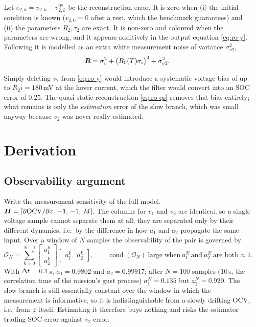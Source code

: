 \begin{assumption}\label{as:ro-cost}
Let $e_{2,k}=v_{2,k}-v^{\mathrm{qs}}_{2,k}$ be the reconstruction error.  It is zero when (i) the
initial condition is known ($v_{2,0}=0$ after a rest, which the benchmark guarantees) and (ii) the
parameters $R_2,\tau_2$ are exact.  It is non-zero and coloured when the parameters are wrong, and
it appears additively in the output equation \eqref{eq:ro-y}.  Following
\cite[Ch.~10]{simon2006} it is modelled as an extra white measurement noise of variance
$\sigma_{v2}^2$,
\begin{equation}
\bm{R} = \sigma_v^2 + \big(R_0(T)\sigma_i\big)^2 + \sigma_{v2}^2 .
\label{eq:ro-R}
\end{equation}
\end{assumption}

\begin{remark}\label{rem:ro-notdrop}
Simply deleting $v_2$ from \eqref{eq:ro-y} would introduce a systematic voltage bias of up to
$R_2 i=180$\,mV at the hover current, which the filter would convert into an SOC error of
$0.25$.  The quasi-static reconstruction \eqref{eq:ro-qs} removes that bias entirely; what remains
is only the \emph{estimation} error of the slow branch, which was small anyway because $v_2$ was
never really estimated.
\end{remark}

\section{Derivation}

\subsection{Observability argument}
Write the measurement sensitivity of the full model,
$\bm{H}=[\partial\mathrm{OCV}/\partial z,\,-1,\,-1,\,M]$.  The columns for $v_1$ and $v_2$ are identical,
so a single voltage sample cannot separate them at all; they are separated only by their different
dynamics, i.e.\ by the difference in how $a_1$ and $a_2$ propagate the same input.  Over a window
of $N$ samples the observability of the pair is governed by
\begin{equation}
\mathcal{O}_N=\sum_{k=0}^{N-1}\begin{bmatrix}a_1^k\\a_2^k\end{bmatrix}
                              \begin{bmatrix}a_1^k&a_2^k\end{bmatrix},
\qquad
\operatorname{cond}(\mathcal{O}_N)\ \text{large when}\ a_1^N\ \text{and}\ a_2^N\ \text{are both}\approx1 .
\label{eq:ro-obs}
\end{equation}
With $\Delta t=0.1$\,s, $a_1=0.9802$ and $a_2=0.99917$: after $N=100$ samples (10\,s, the correlation
time of the mission's gust process) $a_1^N=0.135$ but $a_2^N=0.920$.  The slow branch is still
essentially constant over the window in which the measurement is informative, so it is
indistinguishable from a slowly drifting OCV, i.e.\ from $z$ itself.  Estimating it therefore
buys nothing and risks the estimator trading SOC error against $v_2$ error.


